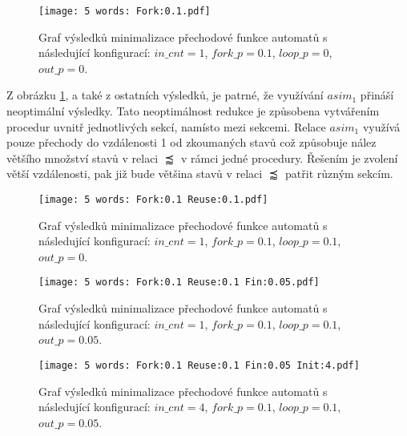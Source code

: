        \begin{figure}[h]
            \centering
            \captionsetup{justification=justified}
            \texttt{[image: 5 words: Fork:0.1.pdf]}
            \caption{Graf výsledků minimalizace přechodové funkce automatů s následující konfigurací: $in\_cnt = 1$, $fork\_p = 0.1$, $loop\_p = 0$, $out\_p = 0$.}
            \label{res1}
        \end{figure}


        Z obrázku \ref{res1}, a také z ostatních výsledků, je patrné, že využívání $asim_1$ přináší neoptimální výsledky. Tato neoptimálnost redukce je způsobena vytvářením procedur uvnitř jednotlivých sekcí, namísto mezi sekcemi. Relace $asim_1$ využívá pouze přechody do vzdálenosti 1 od zkoumaných stavů což způsobuje nález většího množství stavů v relaci $\precapprox$ v rámci jedné procedury. Řešením je zvolení větší vzdálenosti, pak již bude většina stavů v relaci $\precapprox$ patřit různým sekcím.

        \begin{figure}[h]
            \centering
            \captionsetup{justification=justified}
            \texttt{[image: 5 words: Fork:0.1 Reuse:0.1.pdf]}
            \caption{Graf výsledků minimalizace přechodové funkce automatů s následující konfigurací: $in\_cnt = 1$, $fork\_p = 0.1$, $loop\_p = 0.1$, $out\_p = 0$.}
            \label{res2}
        \end{figure}

        \begin{figure}[h]
            \centering
            \captionsetup{justification=justified}
            \texttt{[image: 5 words: Fork:0.1 Reuse:0.1 Fin:0.05.pdf]}
            \caption{Graf výsledků minimalizace přechodové funkce automatů s následující konfigurací: $in\_cnt = 1$, $fork\_p = 0.1$, $loop\_p = 0.1$, $out\_p = 0.05$.}
            \label{res3}
        \end{figure}

        \begin{figure}[h]
            \centering
            \captionsetup{justification=justified}
            \texttt{[image: 5 words: Fork:0.1 Reuse:0.1 Fin:0.05 Init:4.pdf]}
            \caption{Graf výsledků minimalizace přechodové funkce automatů s následující konfigurací: $in\_cnt = 4$, $fork\_p = 0.1$, $loop\_p = 0.1$, $out\_p = 0.05$.}
            \label{res4}
        \end{figure}

